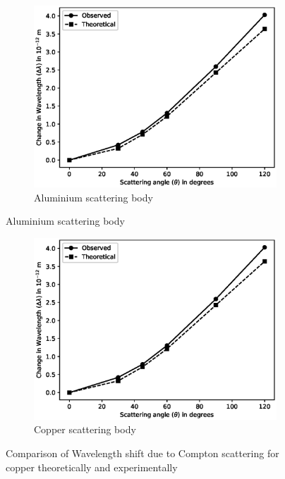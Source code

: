 \begin{figure}[H]
    \begin{subfigure}{\linewidth}
        \centering
        \includegraphics[width=1\columnwidth]{images/al.eps}
        \caption{Aluminium scattering body}
    \end{subfigure}
\end{figure}
\begin{figure}[H]
    \ContinuedFloat
    \begin{subfigure}{\linewidth}
        \centering
        \includegraphics[width=1\columnwidth]{images/al.eps}
        \caption{Copper scattering body}
    \end{subfigure}
    \caption{Comparison of Wavelength shift due to Compton scattering for copper theoretically and experimentally}
    \label{plot3}
\end{figure}

